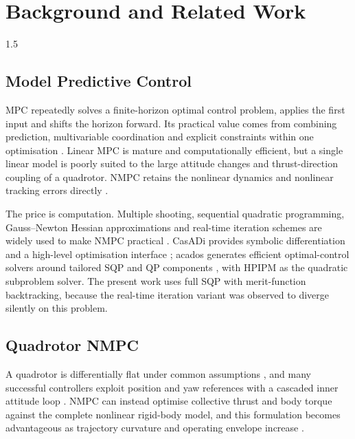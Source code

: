 
\chapter{Background and Related Work}
\label{ch:literature}
\begin{spacing}{1.5}
\setlength{\parskip}{0.22in}

\section{Model Predictive Control}

MPC repeatedly solves a finite-horizon optimal control problem, applies the first
input and shifts the horizon forward. Its practical value comes from combining
prediction, multivariable coordination and explicit constraints within one
optimisation \cite{rawlings2017mpc,mayne2014mpc}. Linear MPC is mature and
computationally efficient, but a single linear model is poorly suited to the
large attitude changes and thrust-direction coupling of a quadrotor. NMPC retains
the nonlinear dynamics and nonlinear tracking errors directly
\cite{grune2017nmpc}.

The price is computation. Multiple shooting, sequential quadratic programming,
Gauss--Newton Hessian approximations and real-time iteration schemes are widely
used to make NMPC practical \cite{diehl2005rti}. CasADi provides symbolic
differentiation and a high-level optimisation interface
\cite{andersson2019casadi}; acados generates efficient optimal-control solvers
around tailored SQP and QP components \cite{acados,verschueren2022acados}, with
HPIPM \cite{hpipm} as the quadratic subproblem solver. The present work uses full
SQP with merit-function backtracking, because the real-time iteration variant was
observed to diverge silently on this problem.

\section{Quadrotor NMPC}

A quadrotor is differentially flat under common assumptions \cite{mellinger2011},
and many successful controllers exploit position and yaw references with a
cascaded inner attitude loop \cite{lee2010}. NMPC can instead optimise collective
thrust and body torque against the complete nonlinear rigid-body model, and this
formulation becomes advantageous as trajectory curvature and operating envelope
increase \cite{kamel2017linear,foehn2021}.


\end{spacing}
